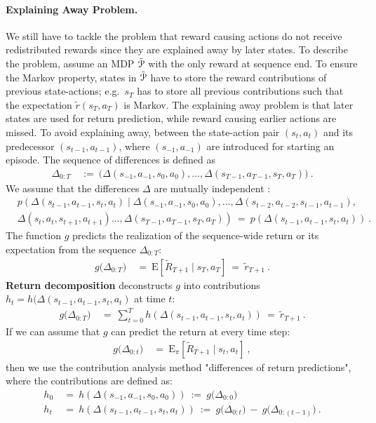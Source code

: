 \documentclass{article}
\newcommand\EXP{\mathbf{\mathrm{E}}}
\begin{document}
\begin{appendices}
\paragraph{Explaining Away Problem.}
\label{para:AexplainingAway}
We still have to tackle the problem that reward causing actions do not receive redistributed rewards
since they are explained away by later states.
To describe the problem, assume an MDP $\tilde{\mathcal{P}}$ with the only 
reward at sequence end.
To ensure the Markov property, states in $\tilde{\mathcal{P}}$ have to store 
the reward contributions of previous state-actions;
e.g.\ $s_T$ has to store all previous contributions such that the expectation $\tilde{r}(s_T,a_T)$
is Markov.
The explaining away problem is that later states
are used for return prediction, while reward causing
earlier actions are missed.
To avoid explaining away,
between the state-action pair $(s_t,a_t)$ and its predecessor $(s_{t-1},a_{t-1})$, where
$(s_{-1},a_{-1})$ are introduced for starting an episode.
The sequence of differences is defined as
\begin{align}
  \Delta_{0:T} \ &:= \  
  \big(\Delta(s_{-1},a_{-1},s_0,a_0),\ldots,\Delta(s_{T-1},a_{T-1},s_T,a_T)\big) \ .
\end{align}
We assume that the differences $\Delta$ 
are mutually independent \cite{Hyvarinen:01}:
\begin{align}
  \label{eq:indept}
  &p \left(\Delta(s_{t-1},a_{t-1},s_t,a_t) \mid
    \Delta(s_{-1},a_{-1},s_0,a_0),\ldots,
    \Delta(s_{t-2},a_{t-2},s_{t-1},a_{t-1}), \right. \\ \nonumber
    &\left. \Delta(s_t,a_t,s_{t+1},a_{t+1})\ldots,
    \Delta(s_{T-1},a_{T-1},s_T,a_T)  \right) \ = \ 
    p\left(\Delta(s_{t-1},a_{t-1},s_t,a_t) \right) \ .
\end{align}
The function $g$ predicts the realization of the sequence-wide
return or its expectation from the sequence $\Delta_{0:T}$:
\begin{align}
  \label{eq:simpleA1}
   g\big(\Delta_{0:T}\big) \ &= \ 
  \EXP \left[\tilde{R}_{T+1} \mid s_T,a_T\right] \ = \ 
  \tilde{r}_{T+1}\ .
\end{align} 
{\bf Return decomposition} deconstructs $g$ into contributions
$h_t=h(\Delta(s_{t-1},a_{t-1},s_t,a_t)$ at time $t$:
\begin{align}
  \label{eq:simpleA}
  g\big(\Delta_{0:T}\big) \ &= \
  \sum_{t=0}^T  h(\Delta(s_{t-1},a_{t-1},s_t,a_t) )
   \ = \ \tilde{r}_{T+1}\ .
\end{align} 
If we can assume that $g$ can predict the return at every time step:
\begin{align}
  g\big(\Delta_{0:t}\big) \ &= \ 
  \EXP_{\pi} \left[\tilde{R}_{T+1} \mid s_t,a_t\right] \ ,
\end{align} 
then we use the contribution analysis method "differences of return predictions",
where the contributions are defined as:
\begin{align}
 h_0 \ &= \ h(\Delta(s_{-1},a_{-1},s_0,a_0) ) \ := \ g\big(\Delta_{0:0}\big) \\
 h_t \ &= \ h(\Delta(s_{t-1},a_{t-1},s_t,a_t) ) \ := \ 
 g\big(\Delta_{0:t}\big) \ - \ g\big(\Delta_{0:(t-1)}\big)\ .
\end{align} 


\end{appendices}
\end{document}
